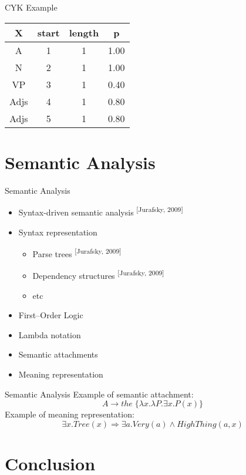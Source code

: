 \documentclass[14pt]{beamer}
\theoremstyle{remark}
\begin{document}
\begin{frame}[t]{CYK Example}
	\centering
	\begin{tabular}{|c|c|c|c|}
			\hline
			X & start & length & p \\
			\hline
			\hline
			A & 1 & 1 & 1.00 \\
			\hline
			N & 2 & 1 & 1.00 \\
			\hline				
			VP & 3 & 1 & 0.40 \\
			\hline
			Adjs & 4 & 1 & 0.80 \\
			\hline
			Adjs & 5 & 1 & 0.80 \\
			\hline
		\end{tabular}
\end{frame}

\section{Semantic Analysis}

\begin{frame}[t]{Semantic Analysis}
	\begin{itemize}
		\item Syntax-driven semantic analysis \textsuperscript{[Jurafsky, 2009]}
		\item Syntax representation
		\begin{itemize}
			\item Parse trees \textsuperscript{[Jurafsky, 2009]}
			\item Dependency structures \textsuperscript{[Jurafsky, 2009]}
			\item etc
		\end{itemize}
		\item First--Order Logic
		\item Lambda notation
		\item Semantic attachments
		\item Meaning representation
	\end{itemize}
\end{frame}

\begin{frame}[t,fragile]{Semantic Analysis}
	Example of semantic attachment:
	\[
		A \rightarrow the \;\{\lambda x.\lambda P.\exists x.P(x)\}
	\]
	Example of meaning representation:
	\[
		\exists x.Tree(x) \Rightarrow \exists a.Very(a) \wedge HighThing(a, x)
	\]
\end{frame}


\section{Conclusion}
\end{document}

